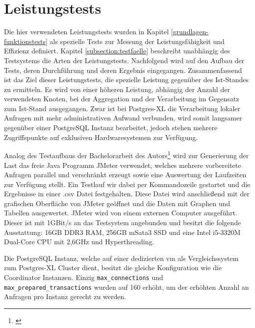 \section{Leistungstests}
\label{section:leistungstests}
Die hier verwendeten Leistungstests wurden in Kapitel \ref{grundlagen-funktionstests} als spezielle Tests zur Messung der Leistungsfähigkeit und Effizienz definiert.
Kapitel \ref{subsection:testfaelle} beschreibt unabhängig des Testsystems die Arten der Leistungstests.
Nachfolgend wird auf den Aufbau der Tests, deren Durchführung und deren Ergebnis eingegangen.
Zusammenfassend ist das Ziel dieser Leistungstests, die spezielle Leistung gegenüber des Ist-Standes zu ermitteln.
Es wird von einer höheren Leistung, abhängig der Anzahl der verwendeten Knoten, bei der Aggregation und der Verarbeitung im Gegensatz zum Ist-Stand ausgegangen.
Zwar ist bei Postgres-XL die Verarbeitung lokaler Anfragen mit mehr administrativen Aufwand verbunden,  wird somit langsamer gegenüber einer PostgreSQL Instanz bearbeitet, jedoch stehen mehrere Zugriffspunkte auf exklusiven Hardwaresystemen zur Verfügung.

Analog des Testaufbaus der Bachelorarbeit des Autors\footnote{\cite{ba:kurt}} wird zur Generierung der Last das freie Java Programm JMeter verwendet, welches mehrere vorbereitete Anfragen parallel und verschränkt erzeugt sowie eine Auswertung der Laufzeiten zur Verfügung stellt.
Ein Testlauf wir dabei per Kommandozeile gestartet und die Ergebnisse in einer .csv Datei festgehalten.
Diese Datei wird anschließend mit der grafischen Oberfläche von JMeter geöffnet und die Daten mit Graphen und Tabellen ausgewertet.
JMeter wird von einem externen Computer ausgeführt.
Dieser ist mit 1GBit/s an das Testsystem angebunden und besitzt die folgende Ausstattung:
16GB DDR3 RAM, 256GB mSata3 SSD und eine Intel i5-3320M Dual-Core CPU mit 2,6GHz und Hyperthreading.

Die PostgreSQL Instanz, welche auf einer dedizierten \Gls{vm} als Vergleichssystem zum Postgres-XL Cluster dient, besitzt die gleiche Konfiguration wie die Coordinator Instanzen.
Einzig \verb+max_connections+ und \verb+max_prepared_transactions+ wurden auf 160 erhöht, um der erhöhten Anzahl an Anfragen pro Instanz  gerecht zu werden.

